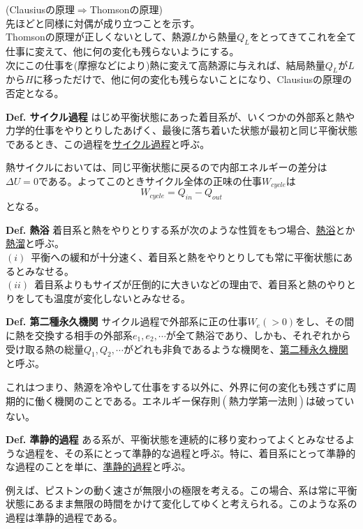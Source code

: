 \documentclass{jsarticle}
\begin{document}
(Clausiusの原理\(\Longrightarrow\)Thomsonの原理)\\
先ほどと同様に対偶が成り立つことを示す。\\
Thomsonの原理が正しくないとして、熱源\(L\)から熱量\(Q_{L}\)をとってきてこれを全て仕事に変えて、他に何の変化も残らないようにする。\\
次にこの仕事を(摩擦などにより)熱に変えて高熱源に与えれば、結局熱量\(Q_{L}\)が\(L\)から\(H\)に移っただけで、他に何の変化も残らないことになり、Clausiusの原理の否定となる。\\
\begin{itembox}[l]{\textbf{Def. サイクル過程}}
はじめ平衡状態にあった着目系が、いくつかの外部系と熱や力学的仕事をやりとりしたあげく、最後に落ち着いた状態が最初と同じ平衡状態であるとき、この過程を\underline{サイクル過程}と呼ぶ。
\end{itembox}
熱サイクルにおいては、同じ平衡状態に戻るので内部エネルギーの差分は\(\Delta U=0\)である。よってこのときサイクル全体の正味の仕事\(W_{cycle}\)は
\[W_{cycle}=Q_{in}-Q_{out}\]
となる。
\begin{itembox}[l]{\textbf{Def. 熱浴}}
着目系と熱をやりとりする系が次のような性質をもつ場合、\underline{熱浴}とか\underline{熱溜}と呼ぶ。\\
\((i)\)~平衡への緩和が十分速く、着目系と熱をやりとりしても常に平衡状態にあるとみなせる。\\
\((ii)\)~着目系よりもサイズが圧倒的に大きいなどの理由で、着目系と熱のやりとりをしても温度が変化しないとみなせる。
\end{itembox}
\begin{itembox}[l]{\textbf{Def. 第二種永久機関}}
サイクル過程で外部系に正の仕事\(W_{e}(>0)\)をし、その間に熱を交換する相手の外部系\(e_{1},e_{2},\cdots\)が全て熱浴であり、しかも、それぞれから受け取る熱の総量\(Q_{1},Q_{2},\cdots\)がどれも非負であるような機関を、\underline{第二種永久機関}と呼ぶ。
\end{itembox}
これはつまり、熱源を冷やして仕事をする以外に、外界に何の変化も残さずに周期的に働く機関のことである。エネルギー保存則\((熱力学第一法則)\)は破っていない。\\
\begin{itembox}[l]{\textbf{Def. 準静的過程}}
ある系が、平衡状態を連続的に移り変わってよくとみなせるような過程を、その系にとって準静的な過程と呼ぶ。特に、着目系にとって準静的な過程のことを単に、\underline{準静的過程}と呼ぶ。
\end{itembox}
例えば、ピストンの動く速さが無限小の極限を考える。この場合、系は常に平衡状態にあるまま無限の時間をかけて変化してゆくと考えられる。このような系の過程は準静的過程である。\\
\end{document}
